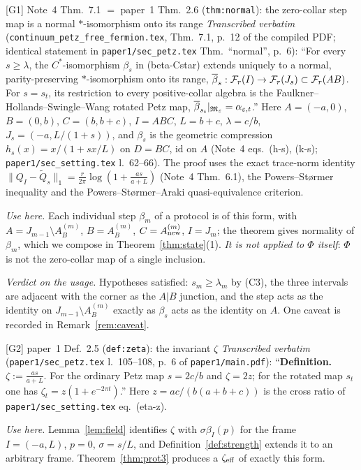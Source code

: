 \documentclass[11pt]{article}
\newcommand{\bI}{\beta_I}
\newcommand{\id}{\mathrm{id}}
\theoremstyle{definition}\newtheorem{example}[theorem]{Example}
\begin{document}
\begin{citedbox}{[G1] Note~4 Thm.~7.1 $=$ paper~1 Thm.~2.6 (\texttt{thm:normal}): the zero-collar
step map is a normal $*$-isomorphism onto its range}
\emph{Transcribed verbatim} (\texttt{continuum\_petz\_free\_fermion.tex}, Thm.~7.1, p.~12 of the
compiled PDF; identical statement in \texttt{paper1/sec\_petz.tex} Thm.~``normal'', p.~6):
``For every $s\ge\lambda$, the $C^*$-isomorphism $\beta_s$ in (beta-Cstar) extends
uniquely to a normal, parity-preserving $*$-isomorphism onto its range,
$\overline\beta_s:\mathcal F_r(I)\to\mathcal F_r(J_s)\subset\mathcal F_r(AB)$.  For $s=s_t$, its restriction to every
positive-collar algebra is the Faulkner--Hollands--Swingle--Wang rotated Petz map,
$\overline\beta_{s_t}|_{\mathfrak M_\varepsilon}=\alpha_{\varepsilon,t}$.''
Here $A=(-a,0)$, $B=(0,b)$, $C=(b,b+c)$, $I=ABC$, $L=b+c$, $\lambda=c/b$, $J_s=(-a,L/(1+s))$, and
$\beta_s$ is the geometric compression $h_s(x)=x/(1+sx/L)$ on $D=BC$, $\id$ on $A$ (Note~4
eqs.~(h-s), (k-s); \texttt{paper1/sec\_setting.tex} l.~62--66).  The proof uses the exact
trace-norm identity $\lVert Q_I-\widetilde Q_s\rVert_1=\frac r{2\pi}\log(1+\frac{as}{a+L})$
(Note~4 Thm.~6.1), the Powers--St\o rmer inequality and the Powers--St\o rmer--Araki
quasi-equivalence criterion.

\emph{Use here.}  Each individual step $\beta_m$ of a protocol is of this form, with
$A=J_{m-1}\setminus A^{(m)}_B$, $B=A^{(m)}_B$, $C=A^{(m)}_{\rm new}$, $I=J_m$; the theorem gives
normality of $\beta_m$, which we compose in Theorem~\ref{thm:state}(1).  \emph{It is not applied
to $\Phi$ itself}: $\Phi$ is not the zero-collar map of a single inclusion.

\emph{Verdict on the usage.}  Hypotheses satisfied: $s_m\ge\lambda_m$ by (C3), the three intervals
are adjacent with the corner as the $A|B$ junction, and the step acts as the identity on
$J_{m-1}\setminus A^{(m)}_B$ exactly as $\beta_s$ acts as the identity on $A$.  One caveat is
recorded in Remark~\ref{rem:caveat}.

\smallskip\noindent{}
\end{citedbox}

\begin{citedbox}{[G2] paper~1 Def.~2.5 (\texttt{def:zeta}): the invariant $\zeta$}
\emph{Transcribed verbatim} (\texttt{paper1/sec\_petz.tex} l.~105--108, p.~6 of
\texttt{paper1/main.pdf}): ``\textbf{Definition.} $\zeta:=\frac{as}{a+L}$.  For the ordinary Petz
map $s=2c/b$ and $\zeta=2z$; for the rotated map $s_t$ one has $\zeta_t=z(1+e^{-2\pi t})$.''
Here $z=ac/(b(a+b+c))$ is the cross ratio of \texttt{paper1/sec\_setting.tex} eq.~(eta-z).

\emph{Use here.}  Lemma~\ref{lem:field} identifies $\zeta$ with $\sigma\bI(p)$ for the frame
$I=(-a,L)$, $p=0$, $\sigma=s/L$, and Definition~\ref{def:strength} extends it to an arbitrary
frame.  Theorem~\ref{thm:prot3} produces a $\zeta_{\rm eff}$ of exactly this form.

\smallskip\noindent{}
\end{citedbox}
\end{document}

